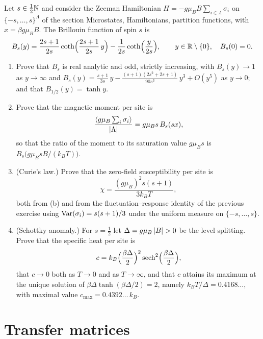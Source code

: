 \begin{exercise}
Let $s\in\tfrac12\mathbb N$ and consider the Zeeman Hamiltonian
$H=-g\mu_BB\sum_{i\in\Lambda}\sigma_i$ on $\{-s,\dots,s\}^\Lambda$ of the
section Microstates, Hamiltonians, partition functions, with
$x=\beta g\mu_BB$.  The Brillouin function of spin $s$ is
\[
 B_s(y)=\frac{2s+1}{2s}\coth\Bigl(\frac{2s+1}{2s}\,y\Bigr)-\frac1{2s}\coth\Bigl(\frac y{2s}\Bigr),
 \qquad y\in\mathbb R\setminus\{0\},\quad B_s(0)=0 .
\]
\begin{enumerate}[label=(\alph*)]
\item Prove that $B_s$ is real analytic and odd, strictly increasing, with
$B_s(y)\to1$ as $y\to\infty$ and
$B_s(y)=\frac{s+1}{3s}\,y-\frac{(s+1)(2s^2+2s+1)}{90s^3}\,y^3+O(y^5)$ as $y\to0$; and
that $B_{1/2}(y)=\tanh y$.
\item Prove that the magnetic moment per site is
\[
 \frac{\langle g\mu_B\sum_i\sigma_i\rangle}{\left\lvert \Lambda\right\rvert}
 =g\mu_Bs\,B_s(sx),
\]
so that the ratio of the moment to its saturation value $g\mu_Bs$ is
$B_s\bigl(g\mu_BsB/(k_BT)\bigr)$.
\item (Curie's law.)  Prove that the zero-field susceptibility per site is
\[
 \chi=\frac{(g\mu_B)^2s(s+1)}{3k_BT},
\]
both from (b) and from the fluctuation--response identity of the previous
exercise using $\operatorname{Var}(\sigma_i)=s(s+1)/3$ under the uniform measure on
$\{-s,\dots,s\}$.
\item (Schottky anomaly.)  For $s=\tfrac12$ let $\Delta=g\mu_B\left\lvert B\right\rvert>0$ be
the level splitting.  Prove that the specific heat per site is
\[
 c=k_B\Bigl(\frac{\beta\Delta}2\Bigr)^2\operatorname{sech}^2\Bigl(\frac{\beta\Delta}2\Bigr),
\]
that $c\to0$ both as $T\to0$ and as $T\to\infty$, and that $c$ attains its
maximum at the unique solution of $\beta\Delta\tanh(\beta\Delta/2)=2$, namely
$k_BT/\Delta=0.4168\ldots$, with maximal value $c_{\max}=0.4392\ldots\,k_B$.
\end{enumerate}
\end{exercise}

\section{Transfer matrices}

